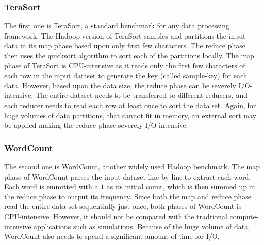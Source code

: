 \documentclass[journal]{IEEEtran}
\begin{document}
\subsubsection{TeraSort}
The first one is TeraSort, a standard benchmark for any data processing framework. The Hadoop version of TeraSort samples and partitions the input data in its map phase based upon only first few characters. The reduce phase then uses the quicksort algorithm to sort each of the partitions locally. 
The map phase of TeraSort is CPU-intensive as it reads only the first few characters of each row in the input dataset to generate the key (called sample-key) for each data. However, based upon the data size, the reduce phase can be severely I/O-intensive. The entire dataset needs to be transferred to different reducers, and each reducer needs to read each row at least once to sort the data set. Again, for huge volumes of data partitions, that cannot fit in memory, an external sort may be applied making the reduce phase severely I/O intensive.  

\subsubsection{WordCount}
The second one is WordCount, another widely used Hadoop benchmark. The map phase of WordCount parses the input dataset line by line to extract each word. Each word is emmitted with a $1$ as its initial count, which is then summed up in the reduce phase to output its  frequency. 
Since both the map and reduce phase read the entire data set sequentially just once, both phases of WordCount is CPU-intensive. However, it should not be compared with the tradtional compute-intensive applications such as simulations. Because of the huge volume of data, WordCount also needs to spend a significant amount of time for I/O.
\end{document}
